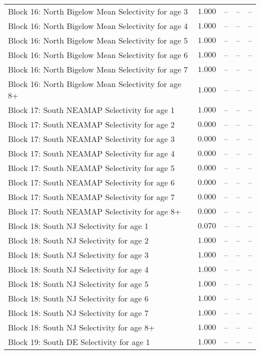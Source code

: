 \documentclass[
]{article}
\begin{document}
\begin{landscape}
\begin{longtable}[t]{lrrrr}
Block 16: North Bigelow Mean Selectivity for age 3 & $1.000$ & -- & -- & --\\
Block 16: North Bigelow Mean Selectivity for age 4 & $1.000$ & -- & -- & --\\
\addlinespace
Block 16: North Bigelow Mean Selectivity for age 5 & $1.000$ & -- & -- & --\\
Block 16: North Bigelow Mean Selectivity for age 6 & $1.000$ & -- & -- & --\\
Block 16: North Bigelow Mean Selectivity for age 7 & $1.000$ & -- & -- & --\\
Block 16: North Bigelow Mean Selectivity for age 8+ & $1.000$ & -- & -- & --\\
Block 17: South NEAMAP Selectivity for age 1 & $1.000$ & -- & -- & --\\
\addlinespace
Block 17: South NEAMAP Selectivity for age 2 & $0.000$ & -- & -- & --\\
Block 17: South NEAMAP Selectivity for age 3 & $0.000$ & -- & -- & --\\
Block 17: South NEAMAP Selectivity for age 4 & $0.000$ & -- & -- & --\\
Block 17: South NEAMAP Selectivity for age 5 & $0.000$ & -- & -- & --\\
Block 17: South NEAMAP Selectivity for age 6 & $0.000$ & -- & -- & --\\
\addlinespace
Block 17: South NEAMAP Selectivity for age 7 & $0.000$ & -- & -- & --\\
Block 17: South NEAMAP Selectivity for age 8+ & $0.000$ & -- & -- & --\\
Block 18: South NJ Selectivity for age 1 & $0.070$ & -- & -- & --\\
Block 18: South NJ Selectivity for age 2 & $1.000$ & -- & -- & --\\
Block 18: South NJ Selectivity for age 3 & $1.000$ & -- & -- & --\\
\addlinespace
Block 18: South NJ Selectivity for age 4 & $1.000$ & -- & -- & --\\
Block 18: South NJ Selectivity for age 5 & $1.000$ & -- & -- & --\\
Block 18: South NJ Selectivity for age 6 & $1.000$ & -- & -- & --\\
Block 18: South NJ Selectivity for age 7 & $1.000$ & -- & -- & --\\
Block 18: South NJ Selectivity for age 8+ & $1.000$ & -- & -- & --\\
\addlinespace
Block 19: South DE Selectivity for age 1 & $1.000$ & -- & -- & --\\

\end{longtable}
\end{landscape}
\end{document}
